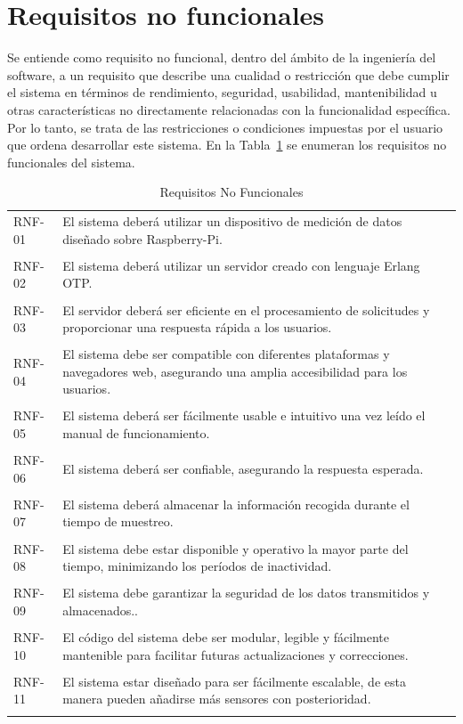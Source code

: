 \section{Requisitos no funcionales}

Se entiende como requisito no funcional, dentro del ámbito de la ingeniería del software, a un requisito que describe una cualidad o restricción que debe cumplir el sistema en términos de rendimiento, seguridad, usabilidad, mantenibilidad u otras características no directamente relacionadas con la funcionalidad específica. Por lo tanto, se trata de las restricciones o condiciones impuestas por el usuario que ordena desarrollar este sistema.
En la Tabla~\ref{tab:requisitosnofunionales} se enumeran los requisitos no funcionales del sistema.
\begin{table}[htbp]

\begin{tabular}{p{2cm} p{12cm}}
RNF-01 & El sistema deberá utilizar un dispositivo de medición de datos diseñado sobre Raspberry-Pi.\\ \\
RNF-02 & El sistema deberá utilizar un servidor creado con lenguaje Erlang OTP.\\ \\
RNF-03 & El servidor deberá ser eficiente en el procesamiento de solicitudes y proporcionar una respuesta rápida a los usuarios.\\ \\
RNF-04 &  El sistema debe ser compatible con diferentes plataformas y navegadores web, asegurando una amplia accesibilidad para los usuarios.\\ \\
RNF-05 & El sistema deberá ser fácilmente usable e intuitivo una vez leído el manual de funcionamiento.\\ \\
RNF-06 &  El sistema deberá ser confiable, asegurando la respuesta esperada.\\ \\
RNF-07 & El sistema deberá almacenar la información recogida durante el tiempo de muestreo. \\ \\
RNF-08 &  El sistema debe estar disponible y operativo la mayor parte del tiempo, minimizando los períodos de inactividad.\\ \\
RNF-09 & El sistema debe garantizar la seguridad de los datos transmitidos y almacenados..\\ \\
RNF-10 & El código del sistema debe ser modular, legible y fácilmente mantenible para facilitar futuras actualizaciones y correcciones.\\ \\
RNF-11 & El sistema estar diseñado para ser fácilmente escalable, de esta manera pueden añadirse más sensores con posterioridad.\\ \\



\end{tabular}
\label{tab:requisitosnofunionales}
\caption{Requisitos No Funcionales}
\end{table}

